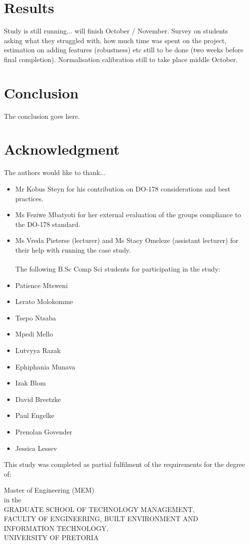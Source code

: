 \documentclass[conference]{IEEEtran}
\begin{document}
\section{Results}

Study is still running... will finish October / November.
Survey on students asking what they struggled with, how much time was spent on the project, estimation on adding features (robustness) etc still to be done (two weeks before final completion). 
Normalisation calibration still to take place middle October.

\section{Conclusion}
The conclusion goes here.






\section*{Acknowledgment}


The authors would like to thank...

\begin{itemize}
\item Mr Kobus Steyn for his contribution on DO-178 considerations and best practices.
\item Ms Feziwe Mbatyoti for her external evaluation of the groups compliance to the DO-178 standard.
\item Ms Vreda Pieterse (lecturer) and Ms Stacy Omeleze (assistant lecturer) for their help with running the case study.
\\
\\
The following B.Sc Comp Sci students for participating in the study:
\item Patience Mtsweni
\item Lerato Molokomme
\item Tsepo Ntsaba
\item Mpedi Mello
\item Lutvyya Razak
\item Ephiphania Munava
\item Izak Blom
\item David Breetzke
\item Paul Engelke
\item Prenolan Govender
\item Jessica Lessev
\\ 
\end{itemize}
This study was completed as partial fulfilment of the requirements for the degree of: \\
\begin{center}Master of Engineering (MEM)\\
in the\\

GRADUATE SCHOOL OF TECHNOLOGY MANAGEMENT,\\
FACULTY OF ENGINEERING, BUILT ENVIRONMENT AND INFORMATION TECHNOLOGY,\\
UNIVERSITY OF PRETORIA
\end{center}




\end{document}
